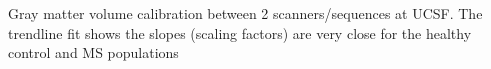 \label{fig:hcms_GMV} Gray matter volume calibration between 2 scanners/sequences at UCSF. The trendline fit shows the slopes (scaling factors) are very close for the healthy control and MS populations